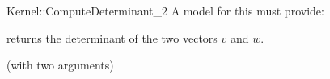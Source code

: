 \begin{ccRefFunctionObjectConcept}{Kernel::ComputeDeterminant_2}
A model for this must provide:


       {returns the determinant of the two vectors $v$ and $w$. }

\ccRefines
{} (with two arguments)

\ccSeeAlso
{} \\
  \\

\end{ccRefFunctionObjectConcept}

